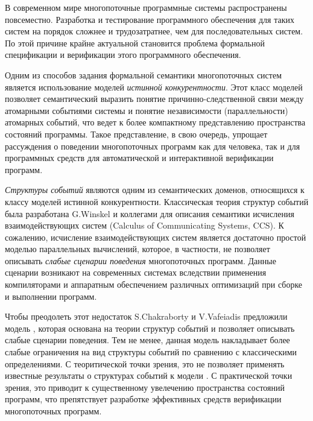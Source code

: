 
{\actuality} 
В современном мире многопоточные программные системы распространены повсеместно. 
Разработка и тестирование программного обеспечения для таких систем на порядок 
сложнее и трудозатратнее, чем для последовательных систем. 
По этой причине крайне актуальной становится проблема 
формальной спецификации и верификации этого программного обеспечения. 

Одним из способов задания формальной семантики многопоточных систем 
является использование моделей \emph{истинной конкурентности}.
Этот класс моделей позволяет семантический выразить
понятие причинно-следственной связи между атомарными событиями системы
и понятие независимости (параллельности) атомарных событий,
что ведет к более компактному представлению пространства состояний программы.
Такое представление, в свою очередь, упрощает рассуждения 
о поведении многопоточных программ как для человека, 
так и для программных средств для автоматической и интерактивной верификации программ. 

\emph{Структуры событий} являются одним из семантических доменов, 
относящихся к классу моделей истинной конкурентности.
Классическая теория структур событий была разработана 
G.Winskel и коллегами для описания семантики 
исчисления взаимодействующих систем (Calculus of Communicating Systems, CCS).
К сожалению, исчисление взаимодействующих систем является 
достаточно простой моделью параллельных вычислений,
которое, в частности, не позволяет описывать 
\emph{слабые сценарии поведения} многопоточных программ.
Данные сценарии возникают на современных системах вследствии 
применения компиляторами и аппаратным обеспечением
различных оптимизаций при сборке и выполнении программ. 

Чтобы преодолеть этот недостаток S.Chakraborty и V.Vafeiadis 
предложили модель \Wkm, которая основана на теории 
структур событий и позволяет описывать слабые сценарии поведения.
Тем не менее, данная модель накладывает более слабые ограничения 
на вид структуры событий по сравнению с классическими определениями. 
С теоритической точки зрения, это не позволяет 
применять известные результаты о структурах событий к модели \Wkm. 
С практической точки зрения, это приводит к существенному увелечению 
пространства состояний программ, что препятствует разработке эффективных 
средств верификации многопоточных программ.

